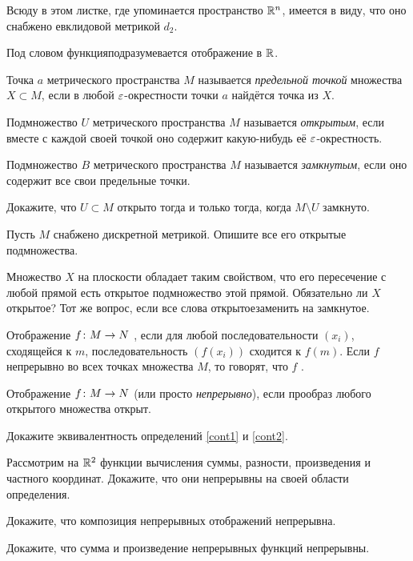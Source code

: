 \documentclass[a4paper,12pt]{article}
\begin{document}

\noindent
Всюду в этом листке, где упоминается пространство $\mathbb{R}^n$, имеется в виду, что оно снабжено евклидовой метрикой $d_2$.

\noindent
Под словом  функция подразумевается отображение в $\mathbb{R}$.

Точка $a$ метрического пространства $M$ называется \emph{предельной точкой} множества $X \subset M$, если в любой $\varepsilon$-окрестности точки $a$ найдётся точка из $X$.

Подмножество $U$ метрического пространства $M$ называется \emph{открытым}, если вместе с каждой своей точкой оно содержит какую-нибудь её $\varepsilon$-окрестность.

Подмножество $B$ метрического пространства $M$ называется \emph{замкнутым}, если оно содержит все свои предельные точки.

Докажите, что $U \subset M$ открыто тогда и только тогда, когда $M \setminus U$ замкнуто.

Пусть $M$ снабжено дискретной метрикой. Опишите все его открытые подмножества.

Множество $X$ на плоскости обладает таким свойством, что его пересечение с любой прямой есть открытое подмножество этой прямой. Обязательно ли $X$ открытое? Тот же вопрос, если все слова  открытое заменить на  замкнутое.

\label{cont1}
Отображение $f \colon M \rightarrow N$ , если для любой последовательности $(x_i)$, сходящейся к $m$, последовательность $(f(x_i))$ сходится к $f(m)$. Если $f$ непрерывно во всех точках множества $M$, то говорят, что $f$ .

\label{cont2}
Отображение $f \colon M \rightarrow N$  (или просто \emph{непрерывно}), если прообраз любого открытого множества открыт.

Докажите эквивалентность определений \ref{cont1} и \ref{cont2}.

Рассмотрим на $\mathbb{R}^2$ функции вычисления суммы, разности, произведения и частного координат. Докажите, что они непрерывны на своей области определения.

Докажите, что композиция непрерывных отображений непрерывна.

Докажите, что сумма и произведение непрерывных функций непрерывны.
\end{document}
